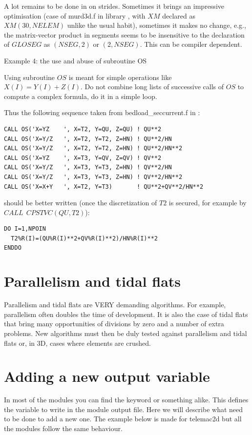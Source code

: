 A lot remains to be done in \telemacsystem on strides. Sometimes it brings an
impressive optimisation (case of murd3d.f in library , with $XM$
declared as $XM(30,NELEM)$ unlike the usual habit), sometimes it makes no
change, e.g., the matrix-vector product in segments seems to be insensitive to
the declaration of $GLOSEG$ as $(NSEG,2)$ or $(2,NSEG)$. This can be compiler
dependent.

Example 4: the use and abuse of subroutine OS

Using subroutine $OS$ is meant for simple operations like $X(I)=Y(I)+Z(I)$. Do
not combine long lists of successive calls of $OS$ to compute a complex formula,
do it in a simple loop.

Thus the following sequence taken from bedload\_seccurrent.f in \sisyphe:
\begin{lstlisting}
CALL OS('X=YZ    ', X=T2, Y=QU, Z=QU) ! QU**2
CALL OS('X=Y/Z   ', X=T2, Y=T2, Z=HN) ! QU**2/HN
CALL OS('X=Y/Z   ', X=T2, Y=T2, Z=HN) ! QU**2/HN**2
CALL OS('X=YZ    ', X=T3, Y=QV, Z=QV) ! QV**2
CALL OS('X=Y/Z   ', X=T3, Y=T3, Z=HN) ! QV**2/HN
CALL OS('X=Y/Z   ', X=T3, Y=T3, Z=HN) ! QV**2/HN**2
CALL OS('X=X+Y   ', X=T2, Y=T3)       ! QU**2+QV**2/HN**2
\end{lstlisting}

should be better written (once the discretization of $T2$ is secured, for
example by $CALL~~CPSTVC(QU, T2)$):

\begin{lstlisting}
DO I=1,NPOIN
  T2%R(I)=(QU%R(I)**2+QV%R(I)**2)/HN%R(I)**2
ENDDO
\end{lstlisting}

\section{Parallelism and tidal flats}

Parallelism and tidal flats are VERY demanding algorithms. For example,
parallelism often doubles the time of development. It is also the case of tidal
flats that bring many opportunities of divisions by zero and a number of extra
problems. New algorithms must then be duly tested against parallelism and tidal
flats or, in 3D, cases where elements are crushed.
%

\section{Adding a new output variable}

In most of the modules you can find the keyword  or something alike.  This defines the variable to write in the module
output file. Here we will describe what need to be done to add a new one. The
example below is made for telemac2d but all the modules follow the same
behaviour.\\

